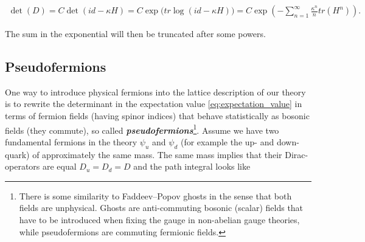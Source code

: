 \documentclass{article}
\theoremstyle{plain} %
\theoremstyle{convention} %
\theoremstyle{remark} %
\def\df#1{\textbf{\textit{#1}}}
\numberwithin{equation}{section}
\begin{document}
\begin{align*}
    \det(D) = C \det(id - \kappa H) = C \exp\big(tr \log(id - \kappa H)\big) = C \exp(- \sum_{n=1}^{\infty} \frac{\kappa^n}{n} tr(H^n)).
\end{align*}

The sum in the exponential will then be truncated after some powers.

\subsection{Pseudofermions}

One way to introduce physical fermions into the lattice description of our theory is to rewrite the determinant in the expectation value \eqref{eq:expectation_value} in terms of fermion fields (having spinor indices) that behave statistically as bosonic fields (they commute), so called \df{pseudofermions}\footnote{There is some similarity to Faddeev–Popov ghosts in the sense that both fields are unphysical. Ghosts are anti-commuting bosonic (scalar) fields that have to be introduced when fixing the gauge in non-abelian gauge theories, while pseudofermions are commuting fermionic fields.}. Assume we have two fundamental fermions in the theory $\psi_u$ and $\psi_d$ (for example the up- and down-quark) of approximately the same mass. The same mass implies that their Dirac-operators are equal $D_u = D_d = D$ and the path integral looks like
\end{document}
